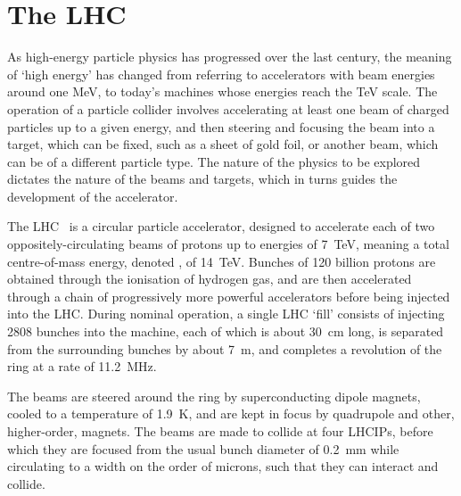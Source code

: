 \chapter{The \acl{LHC}}
\label{chap:intro:lhc}

As high-energy particle physics has progressed over the last century, the 
meaning of `high energy' has changed from referring to accelerators with beam 
energies around one \si{\MeV}, to today's machines whose energies reach the 
\si{\TeV} scale.
The operation of a particle collider involves accelerating at least one beam of 
charged particles up to a given energy, and then steering and focusing the beam 
into a target, which can be fixed, such as a sheet of gold foil, or another 
beam, which can be of a different particle type.
The nature of the physics to be explored dictates the nature of the beams and 
targets, which in turns guides the development of the accelerator.

The \acl{LHC}~\cite{Bruning:2004ej} is a circular particle accelerator, 
designed to accelerate each of two oppositely-circulating beams of protons up 
to energies of \SI{7}{\TeV}, meaning a total centre-of-mass energy, denoted 
\sqrts, of \SI{14}{\TeV}.
Bunches of 120 billion protons are obtained through the ionisation of hydrogen 
gas, and are then accelerated through a chain of progressively more powerful 
accelerators before being injected into the \ac{LHC}.
During nominal operation, a single \ac{LHC} `fill' consists of injecting 2808 
bunches into the machine, each of which is about \SI{30}{\centi\metre} long, is 
separated from the surrounding bunches by about \SI{7}{\metre}, and completes a 
revolution of the ring at a rate of \SI{11.2}{\mega\hertz}.

The beams are steered around the ring by superconducting dipole magnets, cooled 
to a temperature of \SI{1.9}{\kelvin}, and are kept in focus by quadrupole and 
other, higher-order, magnets.
The beams are made to collide at four \acp{LHCIP}, before which they are 
focused from the usual bunch diameter of \SI{0.2}{\milli\metre} while 
circulating to a width on the order of microns, such that they can interact and 
collide.


